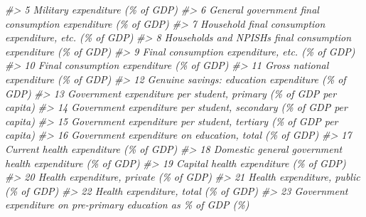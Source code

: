 \documentclass[
  xelatex, ja=standard]{bxjsbook}
\newenvironment{Shaded}{\begin{snugshade}}{\end{snugshade}}
\newcommand{\CommentTok}[1]{\textcolor[rgb]{0.56,0.35,0.01}{\textit{#1}}}
\theoremstyle{definition}
\theoremstyle{definition}
\theoremstyle{definition}
\theoremstyle{definition}
\theoremstyle{remark}
\begin{document}
\begin{Shaded}
\begin{Highlighting}[]
\CommentTok{\#\textgreater{} 5                                                                           Military expenditure (\% of GDP)}
\CommentTok{\#\textgreater{} 6                                               General government final consumption expenditure (\% of GDP)}
\CommentTok{\#\textgreater{} 7                                                  Household final consumption expenditure, etc. (\% of GDP)}
\CommentTok{\#\textgreater{} 8                                            Households and NPISHs final consumption expenditure (\% of GDP)}
\CommentTok{\#\textgreater{} 9                                                            Final consumption expenditure, etc. (\% of GDP)}
\CommentTok{\#\textgreater{} 10                                                                 Final consumption expenditure (\% of GDP)}
\CommentTok{\#\textgreater{} 11                                                                    Gross national expenditure (\% of GDP)}
\CommentTok{\#\textgreater{} 12                                                        Genuine savings: education expenditure (\% of GDP)}
\CommentTok{\#\textgreater{} 13                                        Government expenditure per student, primary (\% of GDP per capita)}
\CommentTok{\#\textgreater{} 14                                      Government expenditure per student, secondary (\% of GDP per capita)}
\CommentTok{\#\textgreater{} 15                                       Government expenditure per student, tertiary (\% of GDP per capita)}
\CommentTok{\#\textgreater{} 16                                                    Government expenditure on education, total (\% of GDP)}
\CommentTok{\#\textgreater{} 17                                                                    Current health expenditure (\% of GDP)}
\CommentTok{\#\textgreater{} 18                                                Domestic general government health expenditure (\% of GDP)}
\CommentTok{\#\textgreater{} 19                                                                    Capital health expenditure (\% of GDP)}
\CommentTok{\#\textgreater{} 20                                                                   Health expenditure, private (\% of GDP)}
\CommentTok{\#\textgreater{} 21                                                                    Health expenditure, public (\% of GDP)}
\CommentTok{\#\textgreater{} 22                                                                     Health expenditure, total (\% of GDP)}
\CommentTok{\#\textgreater{} 23                                          Government expenditure on pre{-}primary education as \% of GDP (\%)}

\end{Highlighting}
\end{Shaded}
\end{document}

